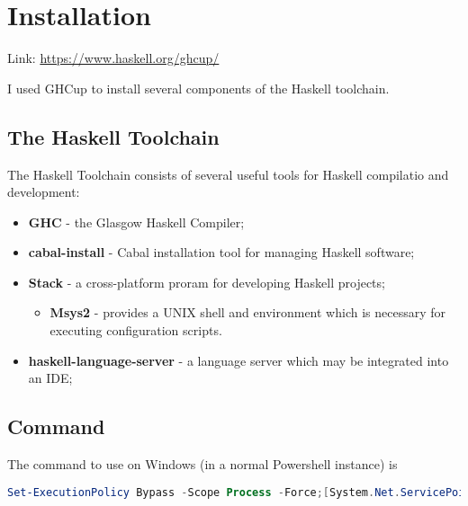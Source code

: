 \section{Installation}
\label{sec:installation}

Link: \url{https://www.haskell.org/ghcup/}

I used GHCup to install several components of the Haskell toolchain.

\subsection{The Haskell Toolchain}
The Haskell Toolchain consists of several useful tools for Haskell compilatio and development:

\begin{itemize}
  \item \textbf{GHC} - the Glasgow Haskell Compiler;
  \item \textbf{cabal-install} - Cabal installation tool for managing Haskell software;
  \item \textbf{Stack} - a cross-platform proram for developing Haskell projects;
  \begin{itemize}
    \item \textbf{Msys2} - provides a UNIX shell and environment which is necessary for executing configuration scripts.
  \end{itemize}
  \item \textbf{haskell-language-server} - a language server which may be integrated into an IDE;
\end{itemize}

\subsection{Command}
The command to use on Windows (in a normal Powershell instance) is



\begin{lstlisting}[language=PowerShell]
  Set-ExecutionPolicy Bypass -Scope Process -Force;[System.Net.ServicePointManager]::SecurityProtocol = [System.Net.ServicePointManager]::SecurityProtocol -bor 3072; try { Invoke-Command -ScriptBlock ([ScriptBlock]::Create((Invoke-WebRequest https://www.haskell.org/ghcup/sh/bootstrap-haskell.ps1 -UseBasicParsing))) -ArgumentList $true } catch { Write-Error $_ }
\end{lstlisting}